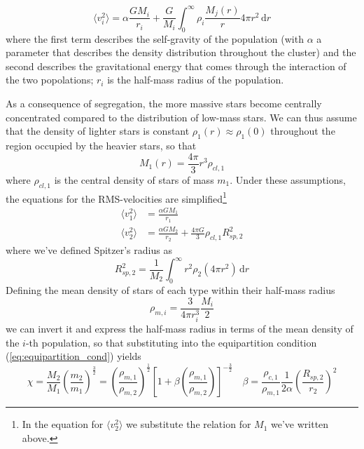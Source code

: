 \begin{equation*}
    \langle v^{2}_{i} \rangle = \alpha\frac{GM_{i}}{r_{i}}+\frac{G}{M_{i}}\int_{0}^{\infty}\rho_{i}\frac{M_{j}(r)}{r}4\pi r^{2}\,\text{d}r
\end{equation*}
where the first term describes the self-gravity of the population (with $\alpha$ a parameter that describes the density distribution throughout the cluster) and the second describes the gravitational energy that comes through the interaction of the two popolations; $r_{i}$ is the half-mass radius of the population.
\par As a consequence of segregation, the more massive stars become centrally concentrated compared to the distribution of low-mass stars. We can thus assume that the density of lighter stars is constant $\rho_{1}(r)\approx\rho_{1}(0)$ throughout the region occupied by the heavier stars, so that 
\begin{equation*}
    M_{1}(r) = \frac{4\pi}{3}r^{3}\rho_{cl,1}
\end{equation*}
where $\rho_{cl,1}$ is the central density of stars of mass $m_{1}$. Under these assumptions, the equations for the RMS-velocities are simplified\footnote{In the equation for $\langle v^{2}_{2} \rangle$ we substitute the relation for $M_{1}$ we've written above.}
\begin{align*}
    \langle v^{2}_{1} \rangle &= \frac{\alpha GM_{1}}{r_{1}}\\
    \langle v^{2}_{2} \rangle &= \frac{\alpha GM_{2}}{r_{2}}+\frac{4\pi G}{3}\rho_{cl,1}R_{sp,2}^{2}
\end{align*}
where we've defined Spitzer's radius as
\begin{equation}
    R_{sp,2}^{2} = \frac{1}{M_{2}}\int_{0}^{\infty}r^{2}\rho_{2}(4\pi r^{2})\,\text{d}r
    \label{eq:spitzerradius}
\end{equation}
Defining the mean density of stars of each type within their half-mass radius
\begin{equation*}
    \rho_{m,i} = \frac{3}{4\pi r^{3}_{i}}\frac{M_{i}}{2}
\end{equation*}
we can invert it and express the half-mass radius in terms of the mean density of the $i$-th population, so that substituting into the equipartition condition (\ref{eq:equipartition_cond}) yields
\begin{equation}
    \chi = \frac{M_{2}}{M_{1}}\left(\frac{m_{2}}{m_{1}}\right)^{\frac{3}{2}} = \left(\frac{\rho_{m,1}}{\rho_{m,2}}\right)^{\frac{1}{2}}\left[1+\beta\left(\frac{\rho_{m,1}}{\rho_{m,2}}\right)\right]^{-\frac{3}{2}} \quad \beta = \frac{\rho_{c,1}}{\rho_{m,1}}\frac{1}{2\alpha}\left(\frac{R_{sp,2}}{r_{2}}\right)^{2}
    \label{eq:spitzer_gen}
\end{equation}
